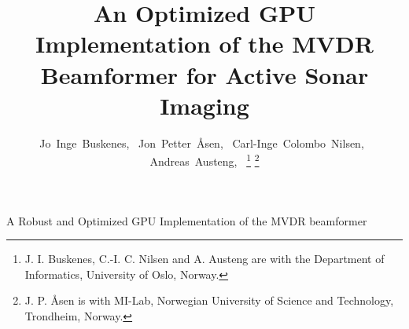 \documentclass[12pt,journal,draftclsnofoot,onecolumn]{IEEEtran}
\newcommand\1{\vec 1}
\begin{document}
\title{An Optimized GPU Implementation of the MVDR Beamformer for Active Sonar Imaging}

\author{Jo~Inge~Buskenes,~ %
        Jon~Petter~\AA{}sen,~ %
        Carl-Inge~Colombo~Nilsen,~ %
        Andreas~Austeng,~%
\thanks{J. I. Buskenes, C.-I. C. Nilsen and A. Austeng are with the Department of Informatics, University of Oslo, Norway.}%
\thanks{J. P. \AA{}sen is with MI-Lab, Norwegian University of Science and Technology, Trondheim, Norway.}%
}

%
{A Robust and Optimized GPU Implementation of the MVDR beamformer}


\end{document}
